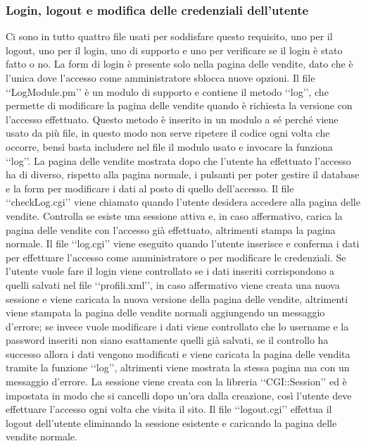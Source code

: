 {{		\subsubsection{Login, logout e modifica delle credenziali dell'utente}
			Ci sono in tutto quattro file usati per soddisfare questo requisito, uno per il logout, uno per il login, uno di supporto e uno per verificare se il login è stato fatto o no. La form di login è presente solo nella pagina delle vendite, dato che è l'unica dove l'accesso come amministratore sblocca nuove opzioni.
			Il file ‘‘LogModule.pm’’ è un modulo di supporto e contiene il metodo ‘‘log’’, che permette di modificare la pagina delle vendite quando è richiesta la versione con l'accesso effettuato. Questo metodo è inserito in un modulo a sé perché viene usato da più file, in questo modo non serve ripetere il codice ogni volta che occorre, bensì basta includere nel file il modulo usato e invocare la funziona ‘‘log’’. La pagina delle vendite mostrata dopo che l'utente ha effettuato l'accesso ha di diverso, rispetto alla pagina normale, i pulsanti per poter gestire il database e la form per modificare i dati al posto di quello dell'accesso.
			Il file ‘‘checkLog.cgi’’ viene chiamato quando l'utente desidera accedere alla pagina delle vendite. Controlla se esiste una sessione attiva e, in caso affermativo, carica la pagina delle vendite con l'accesso già effettuato, altrimenti stampa la pagina normale.
			Il file ‘‘log.cgi’’ viene eseguito quando l'utente inserisce e conferma i dati per effettuare l'accesso come amministratore o per modificare le credenziali. Se l'utente vuole fare il login viene controllato se i dati inseriti corrispondono a quelli salvati nel file ‘‘profili.xml’’, in caso affermativo viene creata una nuova sessione e viene caricata la nuova versione della pagina delle vendite, altrimenti viene stampata la pagina delle vendite normali aggiungendo un messaggio d'errore; se invece vuole modificare i dati viene controllato che lo username e la password inseriti non siano esattamente quelli già salvati, se il controllo ha successo allora i dati vengono modificati e viene caricata la pagina delle vendita tramite la funzione ‘‘log’’, altrimenti viene mostrata la stessa pagina ma con un messaggio d'errore. La sessione viene creata con la libreria ‘‘CGI::Session’’ ed è impostata in modo che si cancelli dopo un'ora dalla creazione, così l'utente deve effettuare l'accesso ogni volta che visita il sito.
			Il file ‘‘logout.cgi’’ effettua il logout dell'utente eliminando la sessione esistente e caricando la pagina delle vendite normale.
}}
